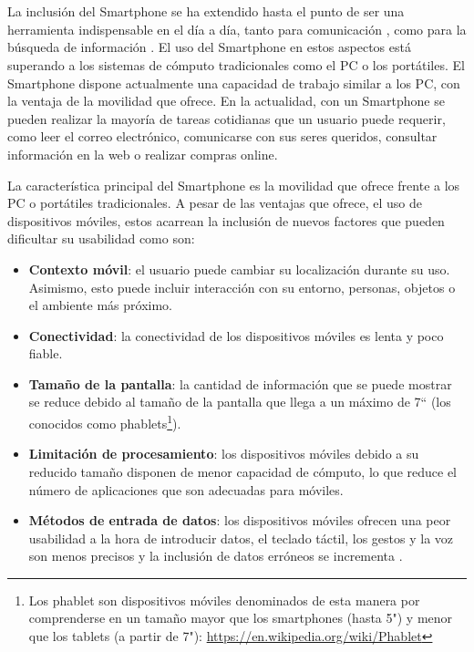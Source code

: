 \chapter{\introduction}
\label{cha:Intro}

La inclusión del Smartphone se ha extendido hasta el punto de ser una herramienta indispensable en el día a día, tanto para comunicación \cite{Montag2015}, como para la búsqueda de información \cite{Wang2016}. El uso del Smartphone en estos aspectos está superando a los sistemas de cómputo tradicionales como el PC o los portátiles. El Smartphone dispone actualmente una capacidad de trabajo similar a los PC, con la ventaja de la movilidad que ofrece. En la actualidad, con un Smartphone se pueden realizar la mayoría de tareas cotidianas que un usuario puede requerir, como leer el correo electrónico, comunicarse con sus seres queridos, consultar información en la web o realizar compras online.

La característica principal del Smartphone es la movilidad que ofrece frente a los PC o portátiles tradicionales. A pesar de las ventajas que ofrece, el uso de dispositivos móviles, estos acarrean la inclusión de nuevos factores que pueden dificultar su usabilidad \cite{zhang2005challenges} como son:
\begin{itemize}
	\item \textbf{Contexto móvil}: el usuario puede cambiar su localización durante su uso. Asimismo, esto puede incluir interacción con su entorno, personas, objetos o el ambiente más próximo.
	\item \textbf{Conectividad}: la conectividad de los dispositivos móviles es lenta y poco fiable.
	\item \textbf{Tamaño de la pantalla}: la cantidad de información que se puede mostrar se reduce debido al tamaño de la pantalla que llega a un máximo de 7`` (los conocidos como phablets\footnote{Los phablet son dispositivos móviles denominados de esta manera por comprenderse en un tamaño mayor que los smartphones (hasta 5") y menor que los tablets (a partir de 7"): \url{https://en.wikipedia.org/wiki/Phablet}}).
	\item \textbf{Limitación de procesamiento}: los dispositivos móviles debido a su reducido tamaño disponen de menor capacidad de cómputo, lo que reduce el número de aplicaciones que son adecuadas para móviles.
	\item \textbf{Métodos de entrada de datos}: los dispositivos móviles ofrecen una peor usabilidad a la hora de introducir datos, el teclado táctil, los gestos y la voz son menos precisos y la inclusión de datos erróneos se incrementa \cite{Flood2011Tedious}. 
\end{itemize}

